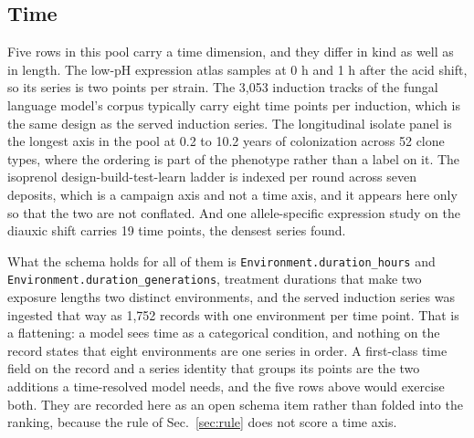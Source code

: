 \subsection{Time}\label{sec:time}

Five rows in this pool carry a time dimension, and they differ in kind as well as in
length. The low-pH expression atlas samples at 0 h and 1 h after the acid shift, so its series
is two points per strain. The 3,053 induction tracks of the fungal language model's corpus
typically carry eight time points per induction, which is the same design as the served
induction series. The longitudinal isolate panel is the longest axis in the pool at 0.2 to 10.2
years of colonization across 52 clone types, where the ordering is part of the phenotype rather
than a label on it. The isoprenol design-build-test-learn ladder is indexed per round across
seven deposits, which is a campaign axis and not a time axis, and it appears here only so that
the two are not conflated. And one allele-specific expression study on the diauxic shift carries 19
time points, the densest series found.

What the schema holds for all of them is \texttt{Environment.duration\_hours} and
\texttt{Environment.duration\_generations}, treatment durations that make two exposure lengths
two distinct environments, and the served induction series was ingested that way as 1,752
records with one environment per time point. That is a flattening: a model sees time as a
categorical condition, and nothing on the record states that eight environments are one series
in order. A first-class time field on the record and a series identity that groups its points
are the two additions a time-resolved model needs, and the five rows above would exercise both.
They are recorded here as an open schema item rather than folded into the
ranking, because the rule of Sec.~\ref{sec:rule} does not score a time axis.

